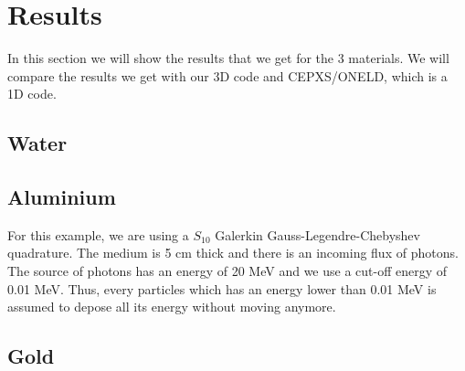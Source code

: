 \section{Results}
In this section we will show the results that we get for the 3 materials. We
will compare the results we get with our 3D code and CEPXS/ONELD, which is a
1D code. 
\subsection{Water}
\subsection{Aluminium}
For this example, we are using a $S_{10}$ Galerkin Gauss-Legendre-Chebyshev 
quadrature. The medium is 5 cm thick and there is an incoming flux of photons.
The source of photons has an energy of 20 MeV and we use a cut-off energy of
0.01 MeV. Thus, every particles which has an energy lower than 0.01 MeV is
assumed to depose all its energy without moving anymore.
\subsection{Gold}

